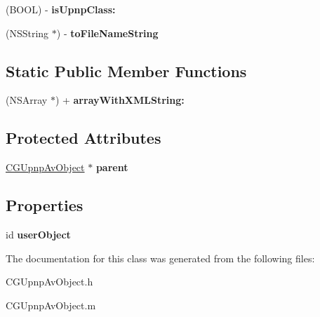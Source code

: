 \begin{DoxyCompactItemize}
\item 
\hypertarget{interface_c_g_upnp_av_object_a7cb24403eccfb921e1f3dabb86d14be6}{(B\-O\-O\-L) -\/ {\bfseries is\-Upnp\-Class\-:}}\label{interface_c_g_upnp_av_object_a7cb24403eccfb921e1f3dabb86d14be6}

\item 
\hypertarget{interface_c_g_upnp_av_object_a7ac92b015ba70c83553508f61a86355a}{(N\-S\-String $\ast$) -\/ {\bfseries to\-File\-Name\-String}}\label{interface_c_g_upnp_av_object_a7ac92b015ba70c83553508f61a86355a}

\end{DoxyCompactItemize}
\subsection*{Static Public Member Functions}
\begin{DoxyCompactItemize}
\item 
\hypertarget{interface_c_g_upnp_av_object_aed8f67d09211ccdb3d67e3f21081bcd9}{(N\-S\-Array $\ast$) + {\bfseries array\-With\-X\-M\-L\-String\-:}}\label{interface_c_g_upnp_av_object_aed8f67d09211ccdb3d67e3f21081bcd9}

\end{DoxyCompactItemize}
\subsection*{Protected Attributes}
\begin{DoxyCompactItemize}
\item 
\hypertarget{interface_c_g_upnp_av_object_a56ecd5e0e3eec6ad0be7c2b2b0ddaabe}{\hyperlink{interface_c_g_upnp_av_object}{C\-G\-Upnp\-Av\-Object} $\ast$ {\bfseries parent}}\label{interface_c_g_upnp_av_object_a56ecd5e0e3eec6ad0be7c2b2b0ddaabe}

\end{DoxyCompactItemize}
\subsection*{Properties}
\begin{DoxyCompactItemize}
\item 
\hypertarget{interface_c_g_upnp_av_object_a3087b0b2f01394d02eab29517d445922}{id {\bfseries user\-Object}}\label{interface_c_g_upnp_av_object_a3087b0b2f01394d02eab29517d445922}

\end{DoxyCompactItemize}


The documentation for this class was generated from the following files\-:\begin{DoxyCompactItemize}
\item 
C\-G\-Upnp\-Av\-Object.\-h\item 
C\-G\-Upnp\-Av\-Object.\-m\end{DoxyCompactItemize}
